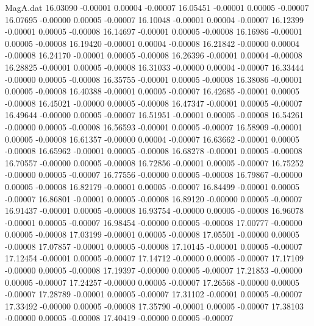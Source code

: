\begin{filecontents}{MagA.dat}
  16.03090   -0.00001    0.00004   -0.00007
  16.05451   -0.00001    0.00005   -0.00007
  16.07695   -0.00000    0.00005   -0.00007
  16.10048   -0.00001    0.00004   -0.00007
  16.12399   -0.00001    0.00005   -0.00008
  16.14697   -0.00001    0.00005   -0.00008
  16.16986   -0.00001    0.00005   -0.00008
  16.19420   -0.00001    0.00004   -0.00008
  16.21842   -0.00000    0.00004   -0.00008
  16.24170   -0.00001    0.00005   -0.00008
  16.26396   -0.00001    0.00004   -0.00008
  16.28825   -0.00001    0.00005   -0.00008
  16.31033   -0.00000    0.00004   -0.00007
  16.33444   -0.00000    0.00005   -0.00008
  16.35755   -0.00001    0.00005   -0.00008
  16.38086   -0.00001    0.00005   -0.00008
  16.40388   -0.00001    0.00005   -0.00007
  16.42685   -0.00001    0.00005   -0.00008
  16.45021   -0.00000    0.00005   -0.00008
  16.47347   -0.00001    0.00005   -0.00007
  16.49644   -0.00000    0.00005   -0.00007
  16.51951   -0.00001    0.00005   -0.00008
  16.54261   -0.00000    0.00005   -0.00008
  16.56593   -0.00001    0.00005   -0.00007
  16.58909   -0.00001    0.00005   -0.00008
  16.61357   -0.00000    0.00004   -0.00007
  16.63662   -0.00001    0.00005   -0.00008
  16.65962   -0.00001    0.00005   -0.00008
  16.68278   -0.00001    0.00005   -0.00008
  16.70557   -0.00000    0.00005   -0.00008
  16.72856   -0.00001    0.00005   -0.00007
  16.75252   -0.00000    0.00005   -0.00007
  16.77556   -0.00000    0.00005   -0.00008
  16.79867   -0.00000    0.00005   -0.00008
  16.82179   -0.00001    0.00005   -0.00007
  16.84499   -0.00001    0.00005   -0.00007
  16.86801   -0.00001    0.00005   -0.00008
  16.89120   -0.00000    0.00005   -0.00007
  16.91437   -0.00001    0.00005   -0.00008
  16.93754   -0.00000    0.00005   -0.00008
  16.96078   -0.00001    0.00005   -0.00007
  16.98454   -0.00000    0.00005   -0.00008
  17.00777   -0.00000    0.00005   -0.00008
  17.03199   -0.00001    0.00005   -0.00008
  17.05501   -0.00000    0.00005   -0.00008
  17.07857   -0.00001    0.00005   -0.00008
  17.10145   -0.00001    0.00005   -0.00007
  17.12454   -0.00001    0.00005   -0.00007
  17.14712   -0.00000    0.00005   -0.00007
  17.17109   -0.00000    0.00005   -0.00008
  17.19397   -0.00000    0.00005   -0.00007
  17.21853   -0.00000    0.00005   -0.00007
  17.24257   -0.00000    0.00005   -0.00007
  17.26568   -0.00000    0.00005   -0.00007
  17.28789   -0.00001    0.00005   -0.00007
  17.31102   -0.00001    0.00005   -0.00007
  17.33492   -0.00000    0.00005   -0.00008
  17.35790   -0.00001    0.00005   -0.00007
  17.38103   -0.00000    0.00005   -0.00008
  17.40419   -0.00000    0.00005   -0.00007

\end{filecontents}
